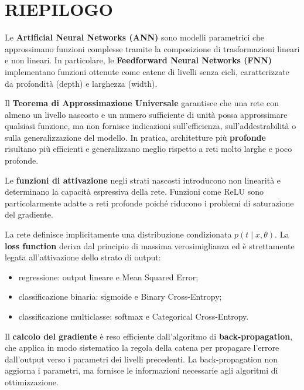 \documentclass[a4paper,12pt]{report}
\begin{document}
\section*{RIEPILOGO}
\begin{tcolorbox}[
    colback=green!5,
    colframe=green!50!black,
    title= Artificial Neural Networks,
    breakable
]

Le \textbf{Artificial Neural Networks (ANN)} sono modelli parametrici che approssimano funzioni complesse tramite la composizione di trasformazioni lineari e non lineari.  
In particolare, le \textbf{Feedforward Neural Networks (FNN)} implementano funzioni ottenute come catene di livelli senza cicli, caratterizzate da profondità (depth) e larghezza (width).

Il \textbf{Teorema di Approssimazione Universale} garantisce che una rete con almeno un livello nascosto e un numero sufficiente di unità possa approssimare qualsiasi funzione, ma non fornisce indicazioni sull’efficienza, sull’addestrabilità o sulla generalizzazione del modello.  
In pratica, architetture più \textbf{profonde} risultano più efficienti e generalizzano meglio rispetto a reti molto larghe e poco profonde.

Le \textbf{funzioni di attivazione} negli strati nascosti introducono non linearità e determinano la capacità espressiva della rete.  
Funzioni come ReLU sono particolarmente adatte a reti profonde poiché riducono i problemi di saturazione del gradiente.

La rete definisce implicitamente una distribuzione condizionata $p(t \mid x, \theta)$.  
La \textbf{loss function} deriva dal principio di massima verosimiglianza ed è strettamente legata all’attivazione dello strato di output:
\begin{itemize}
    \item regressione: output lineare e Mean Squared Error;
    \item classificazione binaria: sigmoide e Binary Cross-Entropy;
    \item classificazione multiclasse: softmax e Categorical Cross-Entropy.
\end{itemize}

Il \textbf{calcolo del gradiente} è reso efficiente dall’algoritmo di \textbf{back-propagation}, che applica in modo sistematico la regola della catena per propagare l’errore dall’output verso i parametri dei livelli precedenti.  
La back-propagation non aggiorna i parametri, ma fornisce le informazioni necessarie agli algoritmi di ottimizzazione.


\end{tcolorbox}
\end{document}
